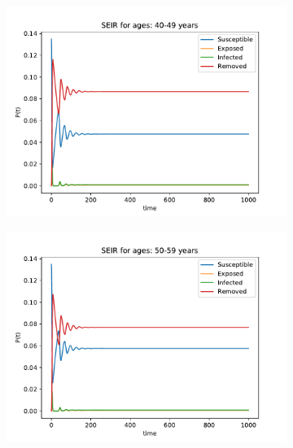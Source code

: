 \begin{figure}[H]
\begin{subfigure}{0.40\textwidth}
\includegraphics[width = \textwidth]{../fig/SEIR_40-49_n.pdf}
\caption{\protect}
\end{subfigure}
\begin{subfigure}{0.40\textwidth}
\includegraphics[width = \textwidth]{../fig/SEIR_50-59_n.pdf}
\caption{\protect}
\end{subfigure}
\begin{subfigure}{0.40\textwidth}

\end{subfigure}
\end{figure}
